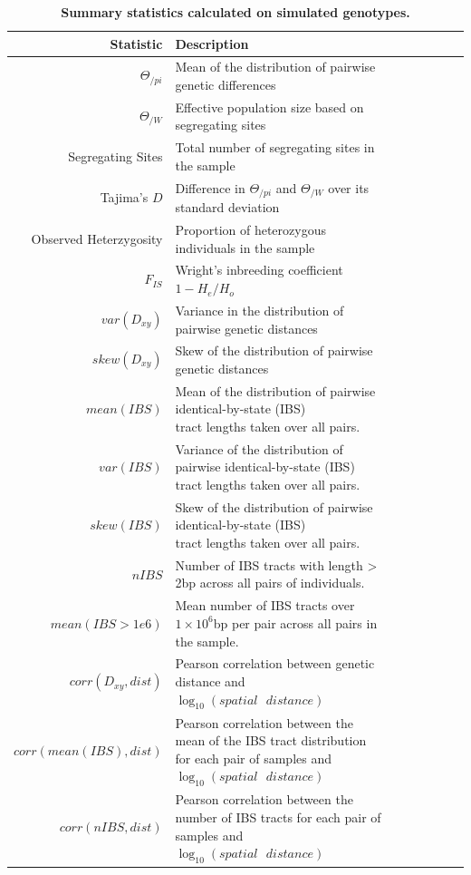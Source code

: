 \documentclass[11pt,twoside,lineno]{preprint}
\begin{document}
\begin{table}
\small
\centering
\caption{\bf Summary statistics calculated on simulated genotypes.}
\begin{tabular}{rllrrrrr}
  \hline
Statistic & Description \\ 
  \hline
$\Theta_{/pi}$ & Mean of the distribution of pairwise genetic differences \\
$\Theta_{/W}$ & Effective population size based on segregating sites \\
Segregating Sites & Total number of segregating sites in the sample \\
Tajima's $D$ & Difference in $\Theta_{/pi}$ and $\Theta_{/W}$ over its standard deviation\\
Observed Heterzygosity & Proportion of heterozygous individuals in the sample \\
$F_{IS}$ & Wright's inbreeding coefficient $1-H_{e}/H_{o}$ \\
$var(D_{xy})$ & Variance in the distribution of pairwise genetic distances \\
$skew(D_{xy})$ & Skew of the distribution of pairwise genetic distances \\
$mean(IBS)$ & \makecell[l]{Mean of the distribution of pairwise identical-by-state (IBS) \\tract lengths taken over all pairs.} \\
$var(IBS)$ & \makecell[l]{Variance of the distribution of pairwise identical-by-state (IBS) \\tract lengths taken over all pairs.} \\
$skew(IBS)$ & \makecell[l]{Skew of the distribution of pairwise identical-by-state (IBS) \\tract lengths taken over all pairs.} \\
$nIBS$ & Number of IBS tracts with length > 2bp across all pairs of individuals. \\
$mean(IBS>1e6)$ & \makecell[l]{Mean number of IBS tracts over $1\times10^6$bp per pair \\across all pairs in the sample.} \\ 
$corr(D_{xy},dist)$ & Pearson correlation between genetic distance and $\log_{10}(spatial\text{ }distance)$ \\
$corr(mean(IBS),dist)$ & \makecell[l]{Pearson correlation between the mean of the IBS tract distribution \\for each pair of samples and $\log_{10}(spatial\text{ }distance)$} \\
$corr(nIBS,dist)$ & \makecell[l]{Pearson correlation between the number of IBS tracts \\for each pair of samples and $\log_{10}(spatial\text{ }distance)$} \\

\end{tabular}
\end{table}
\end{document}
